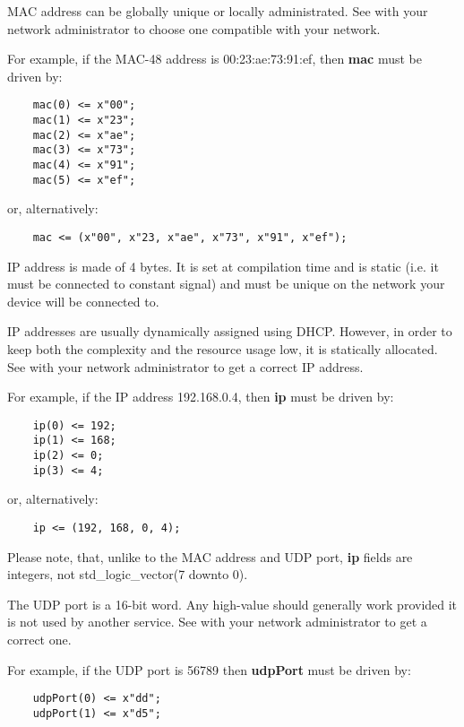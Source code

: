 \documentclass[a4paper]{hitec}
\newcommand{\signal}[1]{\textbf{#1}}
\begin{document}
MAC address can be globally unique or locally administrated. See with your network administrator to choose one compatible with your network.

For example, if the MAC-48 address is 00:23:ae:73:91:ef, then \signal{mac} must be driven by:

\begin{lstlisting}
	mac(0) <= x"00";
	mac(1) <= x"23";
	mac(2) <= x"ae";
	mac(3) <= x"73";
	mac(4) <= x"91";
	mac(5) <= x"ef";
\end{lstlisting}

or, alternatively:

\begin{lstlisting}
	mac <= (x"00", x"23, x"ae", x"73", x"91", x"ef");
\end{lstlisting}

IP address is made of 4 bytes. It is set at compilation time and is static (i.e. it must be connected to constant signal) and must be unique on the network your device will be connected to.

IP addresses are usually dynamically assigned using DHCP. However, in order to keep both the complexity and the resource usage low, it is statically allocated. See with your network administrator to get a correct IP address.

For example, if the IP address 192.168.0.4, then \signal{ip} must be driven by:

\begin{lstlisting}
	ip(0) <= 192;
	ip(1) <= 168;
	ip(2) <= 0;
	ip(3) <= 4;
\end{lstlisting}

or, alternatively:

\begin{lstlisting}
	ip <= (192, 168, 0, 4);
\end{lstlisting}

Please note, that, unlike to the MAC address and UDP port, \signal{ip} fields are integers, not std\_logic\_vector(7 downto 0).

The UDP port is a 16-bit word. Any high-value should generally work provided it is not used by another service. See with your network administrator to get a correct one.

For example, if the UDP port is 56789 then \signal{udpPort} must be driven by:

\begin{lstlisting}
	udpPort(0) <= x"dd";
	udpPort(1) <= x"d5";
\end{lstlisting}
\end{document}
